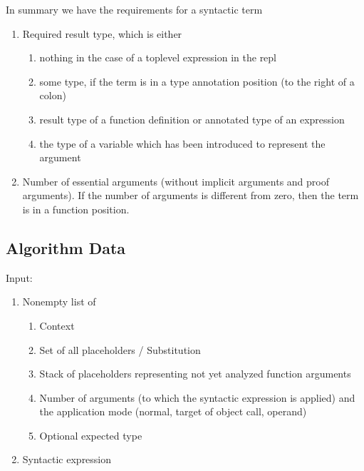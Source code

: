 \noindent In summary we have the requirements for a syntactic term
%
\begin{enumerate}

\item Required result type, which is either
  \begin{enumerate}

  \item nothing in the case of a toplevel expression in the repl

  \item some type, if the term is in a type annotation position (to the right
    of a colon)

  \item result type of a function definition or annotated type of an expression

  \item the type of a variable which has been introduced to represent the
    argument
  \end{enumerate}


\item Number of essential arguments (without implicit arguments and proof
  arguments). If the number of arguments is different from zero, then the term
  is in a function position.
\end{enumerate}







%
\subsection{Algorithm Data}


\noindent Input:

\begin{enumerate}

\item Nonempty list of

  \begin{enumerate}

  \item Context

  \item Set of all placeholders / Substitution

  \item Stack of placeholders representing not yet analyzed function arguments

  \item Number of arguments (to which the syntactic expression is applied) and
    the application mode (normal, target of object call, operand)

  \item Optional expected type
  \end{enumerate}

\item Syntactic expression
\end{enumerate}

